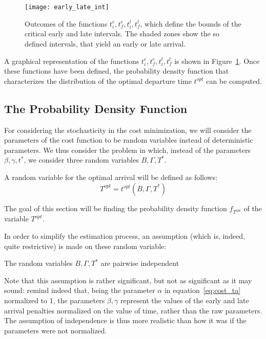 \begin{figure}
  \centering
  \texttt{[image: early\_late\_int]}
  \caption{Outcomes of the functions \(t_i^e, t_f^e, t_i^l, t_f^l\),
    which define the bounds of the critical early and late intervals.
    The shaded zones show the so defined intervals,
  that yield an early or late arrival.}
  \label{fig:early-late-int}
\end{figure}

A graphical representation of the functions \(t_i^e, t_f^e, t_i^l, t_f^l\) is shown in Figure~\ref{fig:early-late-int}.
Once these functions have been defined,
the probability density function that characterizes the distribution of the optimal departure time \(t^{opt}\) can be computed.

\subsection{The Probability Density Function}

For considering the stochasticity in the cost minimization,
we will consider the parameters of the cost function to be random variables instead of deterministic parameters.
We thus consider the problem in which,
instead of the parameters \(\beta, \gamma, t^*\),
we consider three random variables \(B, \Gamma, T^*\).

A random variable for the optimal arrival will be defined as follows:
\begin{equation}
  \label{eq:rv-opt-arr}
  T^{opt} = t^{opt}(B, \Gamma, T^*)
\end{equation}

The goal of this section will be finding the probability density function \(f_{T^{opt}}\) of the variable \(T^{opt}\).

In order to simplify the estimation process, an assumption (which is, indeed, quite restrictive)
is made on these random variable:

\begin{assumption}
  The random variables \(B, \Gamma, T^*\) are pairwise independent
\end{assumption}

Note that this assumption is rather significant,
but not as significant as it may sound:
remind indeed that, being the parameter \(\alpha\) in equation~\eqref{eq:cost_ta} normalized to 1,
the parameters \(\beta, \gamma\) represent the values of the early and late arrival penalties normalized on the value of time,
rather than the raw parameters.
The assumption of independence is thus more realistic than how it was if the parameters were not normalized.

